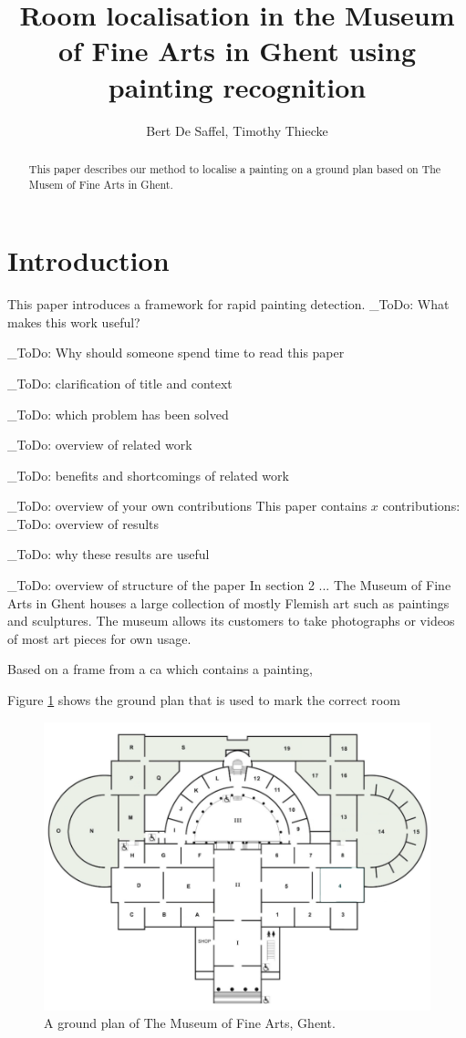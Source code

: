 \documentclass[10pt,final,journal]{IEEEtran}
\title{Room localisation in the Museum of Fine Arts in Ghent using painting recognition}
\author{Bert De Saffel, Timothy Thiecke}
\newcommand{\todo}[1]{\color{red}\_ToDo: #1 \color{black}}
\begin{document}
	\maketitle
	\begin{abstract}
		This paper describes our method to localise a painting on a ground plan based on The Musem of Fine Arts in Ghent. 
	\end{abstract}


	\section{Introduction}
	This paper introduces a framework for rapid painting detection.
	\todo{What makes this work useful?}
	
	\todo{Why should someone spend time to read this paper}
	
	\todo{clarification of title and context}
	
	\todo{which problem has been solved}
	
	\todo{overview of related work}
	
	\todo{benefits and shortcomings of related work}
	
	\todo{overview of your own contributions}
	This paper contains $x$ contributions:
	\todo{overview of results}
	
	\todo{why these results are useful}
	
	\todo{overview of structure of the paper}
	In section 2 ...
	The Museum of Fine Arts in Ghent houses a large collection of mostly Flemish art such as paintings and sculptures. The museum allows its customers to take photographs or videos of most art pieces for own usage. 
	
	Based on a frame from a ca which contains a painting, 
	
	Figure \ref{fig:groundplan_msk} shows the ground plan that is used to mark the correct room
	
	\begin{figure}
		\includegraphics[width=\linewidth]{groundplan_msk}
		\caption{A ground plan of The Museum of Fine Arts, Ghent. }
		\label{fig:groundplan_msk}
	\end{figure}
\end{document}
